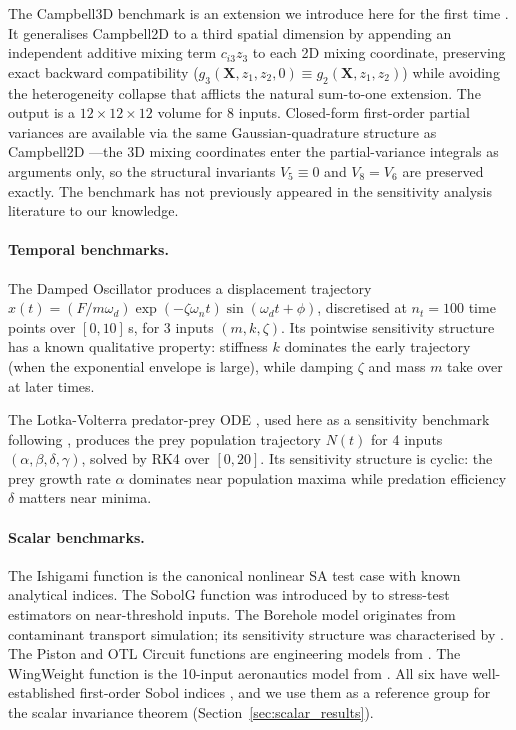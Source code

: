 \documentclass[11pt,onecolumn]{article}
\begin{document}
The Campbell3D benchmark is an extension we introduce here for the first time
\citep{Hettinger2025c3d}.  It generalises Campbell2D to a third spatial dimension
by appending an independent additive mixing term $c_{i3}z_3$ to each 2D mixing
coordinate, preserving exact backward compatibility ($g_3(\mathbf{X},z_1,z_2,0)
\equiv g_2(\mathbf{X},z_1,z_2)$) while avoiding the heterogeneity collapse that
afflicts the natural sum-to-one extension.  The output is a $12\times12\times12$
volume for 8 inputs.  Closed-form first-order partial variances are available
via the same Gaussian-quadrature structure as Campbell2D
\citep{MarrelSpatial2011}---the 3D mixing coordinates enter the partial-variance
integrals as arguments only, so the structural invariants
$V_5 \equiv 0$ and $V_8 = V_6$ are preserved exactly.  The benchmark has not
previously appeared in the sensitivity analysis literature to our knowledge.

\paragraph{Temporal benchmarks.}
The Damped Oscillator \citep{Sudret2008} produces a displacement trajectory
$x(t) = (F/m\omega_d)\exp(-\zeta\omega_n t)\sin(\omega_d t + \phi)$, discretised at
$n_t = 100$ time points over $[0, 10]$\,s, for 3 inputs
$(m, k, \zeta)$.  Its pointwise sensitivity structure has a known qualitative
property: stiffness $k$ dominates the early trajectory (when the exponential
envelope is large), while damping $\zeta$ and mass $m$ take over at later times.

The Lotka-Volterra predator-prey ODE \citep{Lotka1925,Volterra1926}, used here
as a sensitivity benchmark following \citet{Saltelli2005}, produces the prey
population trajectory $N(t)$ for 4 inputs $(\alpha, \beta, \delta, \gamma)$,
solved by RK4 over $[0, 20]$.  Its sensitivity structure is cyclic: the prey
growth rate $\alpha$ dominates near population maxima while predation efficiency
$\delta$ matters near minima.

\paragraph{Scalar benchmarks.}
The Ishigami function \citep{Ishigami1990} is the canonical nonlinear SA test case
with known analytical indices. The SobolG function was introduced by
\citet{SobolLevitan1999} to stress-test estimators on near-threshold inputs.
The Borehole model originates from contaminant transport simulation; its sensitivity
structure was characterised by \citet{MorrisMitchell1993}. The Piston and OTL
Circuit functions are engineering models from \citet{BenAriSteinberg2007}. The
WingWeight function is the 10-input aeronautics model from \citet{Forrester2008}.
All six have well-established first-order Sobol indices \citep{Saltelli2008}, and
we use them as a reference group for the scalar invariance theorem
(Section~\ref{sec:scalar_results}).
\end{document}
